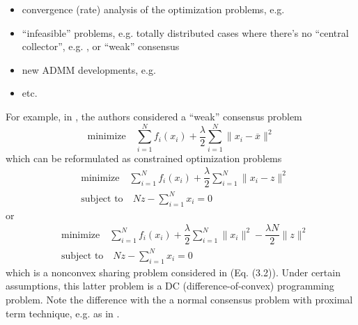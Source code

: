 \begin{itemize}
    \item convergence (rate) analysis of the optimization problems, e.g. \cite{li2019convergence}
    \item ``infeasible'' problems, e.g. totally distributed cases where there's no ``central collector'', e.g. \cite{elgabli2020gadmm,issaid2020cq-ggadmm,francca2020distributed}, or ``weak'' consensus \cite{hanzely2020federated}
    \item new ADMM developments, e.g. \cite{bai2021sas-admm}
    \item etc.
\end{itemize}

For example, in \cite{hanzely2020federated}, the authors considered a ``weak'' consensus problem
$$\text{minimize} \quad \sum\limits_{i=1}^N f_i(x_i) + \dfrac{\lambda}{2} \sum\limits_{i=1}^N \lVert x_i - \overline{x} \rVert^2$$
which can be reformulated as constrained optimization problems
\begin{align*}
    & \text{minimize} \quad \sum\limits_{i=1}^N f_i(x_i) + \dfrac{\lambda}{2} \sum\limits_{i=1}^N \lVert x_i - z \rVert^2 \\
    & \text{subject to} \quad Nz - \sum\limits_{i=1}^N x_i = 0
\end{align*}
or
\begin{align*}
    & \text{minimize} \quad \sum\limits_{i=1}^N f_i(x_i) + \dfrac{\lambda}{2} \sum\limits_{i=1}^N \lVert x_i \rVert^2 -\dfrac{\lambda N}{2} \lVert z \rVert^2 \\
    & \text{subject to} \quad Nz - \sum\limits_{i=1}^N x_i = 0
\end{align*}
which is a nonconvex sharing problem considered in \cite{hong2016convergence} (Eq. (3.2)). Under certain assumptions, this latter problem is a DC (difference-of-convex) programming problem. Note the difference with the a normal consensus problem with proximal term technique, e.g. as in \cite{sahu2018fedprox}.






